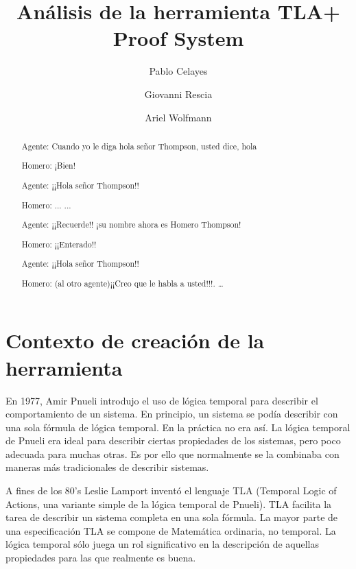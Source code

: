 \documentclass[spanish]{llncs}
\begin{document}
%

\mainmatter              %
%
\title{Análisis de la herramienta TLA+ Proof System}
%
%
\author{Pablo Celayes \and Giovanni Rescia \and Ariel Wolfmann}

%

\maketitle              %

\begin{abstract}
Agente: Cuando yo le diga hola señor Thompson, usted dice, hola

Homero: ¡Bien!

Agente: ¡¡Hola señor Thompson!!

Homero: ... ...

Agente: ¡¡Recuerde!! ¡su nombre ahora es Homero Thompson!

Homero: ¡¡Enterado!!

Agente: ¡¡Hola señor Thompson!!

Homero: (al otro agente)¡¡Creo que le habla a usted!!!. \dots

\end{abstract}
%

\section{Contexto de creación de la herramienta}

 En 1977, Amir Pnueli introdujo el uso de lógica temporal para describir el comportamiento de un sistema. En principio, un sistema se podía describir con una sola fórmula de lógica temporal. En la práctica no era así. La lógica temporal de Pnueli era ideal para describir ciertas propiedades de los sistemas, pero poco adecuada para muchas otras. Es por ello que normalmente se la combinaba con maneras más tradicionales de describir sistemas. \cite{pnueli}

A fines de los 80's Leslie Lamport inventó el lenguaje TLA (Temporal Logic of Actions,
una variante simple de la lógica temporal de Pnueli). TLA facilita la tarea de describir un sistema completa en una sola fórmula. La mayor parte de una especificación TLA se compone de Matemática ordinaria, no temporal. La lógica temporal sólo juega un rol significativo en la descripción de aquellas propiedades para las que realmente es buena. \cite{specsys}
\end{document}
